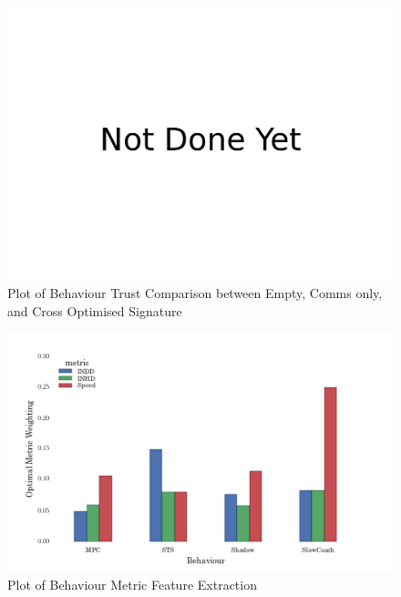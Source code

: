 \documentclass{aamas2016}
\begin{document}
\begin{figure}[h]
	\centering
  \includegraphics[width=\linewidth]{not_done_yet}
	\caption{Plot of Behaviour Trust Comparison between Empty, Comms only, and Cross Optimised Signature}
	\label{fig:comms_trust_signature}
\end{figure}

\begin{figure}[h]
	\centering
  \includegraphics[width=\linewidth]{phys_metric_trust_relevance}
	\caption{Plot of Behaviour Metric Feature Extraction}
	\label{fig:comms_feature_extraction}
\end{figure}
\end{document}
